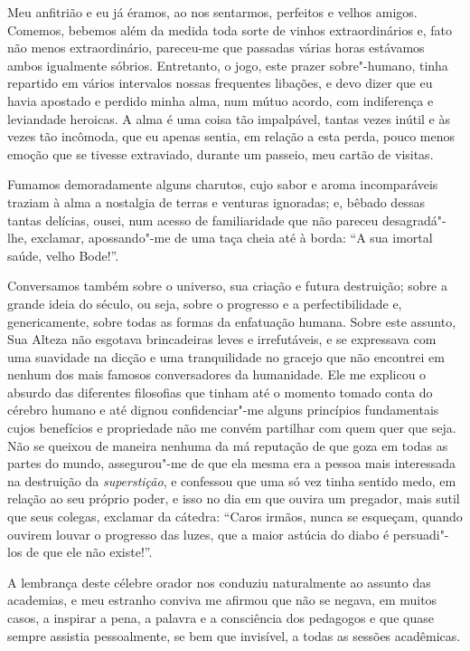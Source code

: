 Meu anfitrião e eu já éramos, ao nos sentarmos, perfeitos e velhos 
amigos. Comemos, bebemos além da medida toda sorte de vinhos
extraordinários e, fato não menos extraordinário, pareceu-me que passadas várias horas estávamos ambos igualmente sóbrios. Entretanto,
o jogo, este prazer sobre"-humano, tinha repartido em vários
intervalos nossas frequentes libações, e devo dizer que eu havia
apostado e perdido minha alma, num mútuo acordo, com indiferença e
leviandade heroicas. A alma é uma coisa tão impalpável, tantas vezes
inútil e às vezes tão incômoda, que eu apenas sentia, em relação a esta
perda, pouco menos emoção que se tivesse extraviado, durante um
passeio, meu cartão de visitas.

Fumamos demoradamente alguns charutos, cujo sabor e aroma incomparáveis
traziam à alma a nostalgia de terras e venturas ignoradas; e,
bêbado dessas tantas delícias, ousei, num acesso de familiaridade que
não pareceu desagradá"-lhe, exclamar, apossando"-me de uma taça cheia
até à borda: “A sua imortal saúde, velho
Bode!''.

Conversamos também sobre o universo, sua criação e futura destruição;
sobre a grande ideia do século, ou seja, sobre o progresso e a
perfectibilidade e, genericamente, sobre todas as formas da enfatuação
humana. Sobre este assunto, Sua Alteza não esgotava brincadeiras leves
e irrefutáveis, e se expressava com uma suavidade na dicção e uma
tranquilidade no gracejo que não encontrei em nenhum dos mais famosos
conversadores da humanidade. Ele me explicou o absurdo das diferentes
filosofias que tinham até o momento tomado conta do cérebro humano e
até dignou confidenciar"-me alguns princípios fundamentais cujos
benefícios e propriedade não me convém partilhar com quem quer que seja.
Não se queixou de maneira nenhuma da má reputação de que goza em todas
as partes do mundo, assegurou"-me de que ela mesma era a pessoa mais
interessada na destruição da \textit{superstição}, e confessou que uma só vez
tinha sentido medo, em relação ao seu próprio poder, e isso no dia em
que ouvira um pregador, mais sutil que seus colegas, exclamar da
cátedra: “Caros irmãos, nunca se esqueçam, quando
ouvirem louvar o progresso das luzes, que a maior astúcia do diabo é
persuadi"-los de que ele não existe!''.

A lembrança deste célebre orador nos conduziu naturalmente ao assunto
das academias, e meu estranho conviva me afirmou que não se negava, em
muitos casos, a inspirar a pena, a palavra e a consciência dos
pedagogos e que quase sempre assistia pessoalmente, se bem que invisível,
a todas as sessões acadêmicas.

